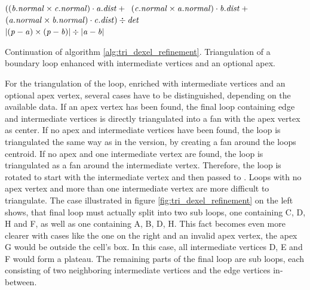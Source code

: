 \begin{algorithm}
\begin{algorithmic}[1]
				\State \Return $((\mathit{b}.\mathit{normal} \times \mathit{c}.\mathit{normal}) \cdot \mathit{a}.\mathit{dist} + {}$\hfill\break
				\hspace*{\dimexpr\algorithmicindent*2}\phantom{\Return $($}$(\mathit{c}.\mathit{normal} \times \mathit{a}.\mathit{normal}) \cdot \mathit{b}.\mathit{dist} + {}$\hfill\break
				\hspace*{\dimexpr\algorithmicindent*2}\phantom{\Return $($}$(\mathit{a}.\mathit{normal} \times \mathit{b}.\mathit{normal}) \cdot \mathit{c}.\mathit{dist}) \div \mathit{det}$
			\EndIf
		\EndFunction
		\\
			\State \Return $|(\mathit{p} - \mathit{a}) \times (\mathit{p} - \mathit{b})| \div |\mathit{a} - \mathit{b}|$
		\EndFunction
	\end{algorithmic}
	\caption{
		Continuation of algorithm \ref{alg:tri_dexel_refinement}.
		Triangulation of a boundary loop enhanced with intermediate vertices and an optional apex.
	}
	\label{alg:tri_dexel_refinement_triangulation}
\end{algorithm}
%
For the triangulation of the loop, enriched with intermediate vertices and an optional apex vertex, several cases have to be distinguished, depending on the available data.
If an apex vertex has been found, the final loop containing edge and intermediate vertices is directly triangulated into a fan with the apex vertex as center.
If no apex and intermediate vertices have been found, the loop is triangulated the same way as in the  version, by creating a fan around the loops centroid.
If no apex and one intermediate vertex are found, the loop is triangulated as a fan around the intermediate vertex.
Therefore, the loop is rotated to start with the intermediate vertex and then passed to .
Loops with no apex vertex and more than one intermediate vertex are more difficult to triangulate.
The case illustrated in figure \ref{fig:tri_dexel_refinement} on the left shows, that final loop must actually split into two sub loops, one containing C, D, H and F, as well as one containing A, B, D, H.
This fact becomes even more clearer with cases like the one on the right and an invalid apex vertex, \eg the apex G would be outside the cell's box.
In this case, all intermediate vertices D, E and F would form a plateau.
The remaining parts of the final loop are sub loops, each consisting of two neighboring intermediate vertices and the edge vertices in-between.
